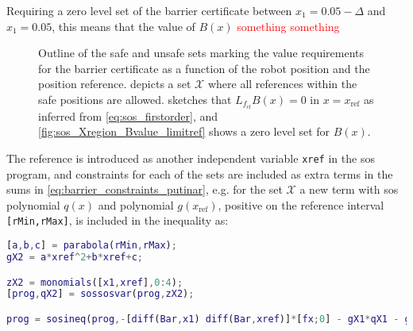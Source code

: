 Requiring a zero level set of the barrier certificate between $x_1=0.05-\Delta$ and $x_1=0.05$, this means that the value of $B(x)$ \textcolor{red}{something something}


\begin{figure}[htbp]
\centering
{}%
\hspace{3mm}
%
\hspace{3mm}
%
\caption{Outline of the safe and unsafe sets marking the value requirements for the barrier certificate as a function of the robot position and the  position reference.  depicts a set $\mathcal{X}$ where all references within the safe positions are allowed.  sketches that $L_{f_{cl}}B(x)=0$  in $x=x_\text{ref}$ as inferred from \autoref{eq:sos_firstorder}, and \autoref{fig:sos_Xregion_Bvalue_limitref} shows a zero level set for $B(x)$.}
\label{fig:sets_reference}
\end{figure}

The reference is introduced as another independent variable \texttt{xref} in the \gls{sos} program, and constraints for each of the sets are included as extra terms in the sums in \autoref{eq:barrier_constraints_putinar}, e.g. for the set $\mathcal{X}$ a new term with \gls{sos} polynomial $q(x)$ and polynomial $g(x_\text{ref})$, positive on the  reference  interval \texttt{[rMin,rMax]}, is included in the inequality as:
\begin{lstlisting}[language=matlab]
% Constraint on the set X0 being nonpositive for the interval of references 
[a,b,c] = parabola(rMin,rMax); 
gX2 = a*xref^2+b*xref+c;

zX2 = monomials([x1,xref],0:4);
[prog,qX2] = sossosvar(prog,zX2);

prog = sosineq(prog,-[diff(Bar,x1) diff(Bar,xref)]*[fx;0] - gX1*qX1 - gX2*qX2);
\end{lstlisting}

